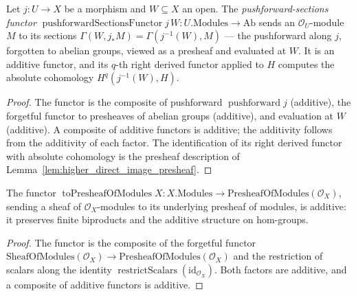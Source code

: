 \begin{lemma}
  \label{lem:pushforward_sections_functor}
  Let \(j : U \to X\) be a morphism and \(W \subseteq X\) an open. The
  \emph{pushforward-sections functor} \(\operatorname{pushforwardSectionsFunctor} j\,W :
  U.\mathrm{Modules} \to \mathrm{Ab}\) sends an \(\mathcal{O}_U\)-module \(M\) to its sections
  \(\Gamma(W, j_* M) = \Gamma(j^{-1}(W), M)\) --- the pushforward along \(j\), forgotten to
  abelian groups, viewed as a presheaf and evaluated at \(W\). It is an additive functor, and
  its \(q\)-th right derived functor applied to \(H\) computes the absolute cohomology
  \(H^q(j^{-1}(W), H)\).
\end{lemma}
\begin{proof}
  The functor is the composite of pushforward \(\operatorname{pushforward} j\) (additive), the
  forgetful functor to presheaves of abelian groups (additive), and evaluation at \(W\)
  (additive). A composite of additive functors is additive; the additivity follows from the additivity of
  each factor. The identification of its right derived functor with
  absolute cohomology is the presheaf description of
  Lemma~\ref{lem:higher_direct_image_presheaf}.
\end{proof}


\begin{lemma}

  \label{lem:toPresheafOfModules_additive}
  The functor \(\operatorname{toPresheafOfModules} X : X.\mathrm{Modules} \to
  \mathrm{PresheafOfModules}(\mathcal{O}_X)\), sending a sheaf of \(\mathcal{O}_X\)-modules to its
  underlying presheaf of modules, is additive: it preserves finite biproducts and the additive
  structure on hom-groups.
\end{lemma}
\begin{proof}

\leanok
  The functor is the composite of the forgetful functor
  \(\mathrm{SheafOfModules}(\mathcal{O}_X) \to \mathrm{PresheafOfModules}(\mathcal{O}_X)\) and the
  restriction of scalars along the identity \(\operatorname{restrictScalars}(\mathrm{id}_{\mathcal{O}_X})\).
  Both factors are additive, and a composite of additive functors is additive.
\end{proof}

